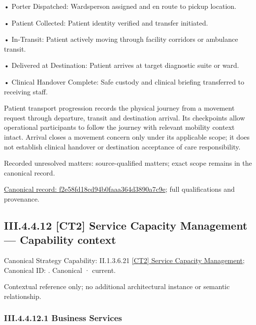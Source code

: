 •
Porter Dispatched: Wardsperson assigned and en route to pickup location.



•
Patient Collected: Patient identity verified and transfer initiated.



•
In-Transit: Patient actively moving through facility corridors or ambulance transit.



•
Delivered at Destination: Patient arrives at target diagnostic suite or ward.



•
Clinical Handover Complete: Safe custody and clinical briefing transferred to receiving staff.



Patient transport progression records the physical journey from a movement request through departure, transit and destination arrival. Its checkpoints allow operational participants to follow the journey with relevant mobility context intact. Arrival closes a movement concern only under its applicable scope; it does not establish clinical handover or destination acceptance of care responsibility.


{\small Recorded unresolved matters: source-qualified matters; exact scope remains in the canonical record.}\par
{\footnotesize \href{../../../../continuum/business/business-process/f2e58fd18cd94b0faaa364d3890a7c9e.md}{Canonical record: f2e58fd18cd94b0faaa364d3890a7c9e}; full qualifications and provenance.}\par
\subsection*{III.4.4.12 [CT2] Service Capacity Management — Capability context}
\label{navigation:III.4.4.12}

{\small Canonical Strategy Capability: II.1.3.6.21 \hyperref[element:d86105bf9c86445394088f65c895d37f]{[CT2] Service Capacity Management}; Canonical ID: \texttt{}. Canonical · current.}\par
Contextual reference only; no additional architectural instance or semantic relationship.\par
\subsubsection*{III.4.4.12.1 Business Services}
\label{navigation:III.4.4.12.1}

